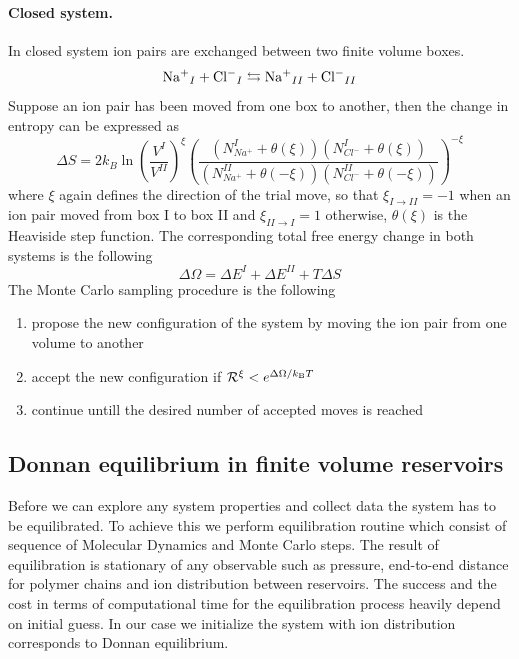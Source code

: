 \documentclass[journal=mamobx, layout=twocolumns,manuscript=article]{achemso}
\begin{document}
\paragraph{Closed system.}
In closed system ion pairs are exchanged between two finite volume boxes.
\begin{equation}
    \mathrm{Na^+}_{I} + \mathrm{Cl^-}_{I} \leftrightarrows \mathrm{Na^+}_{II} + \mathrm{Cl^-}_{II}
\end{equation}
Suppose an ion pair has been moved from one box to another, then the change in entropy can be expressed as
\begin{equation}
    \Delta S = 2 k_B \ln \left(\frac{V^{I}}{V^{II}} \right) ^ {\xi}  \left(\frac{(N_{Na^{+}}^{I}+\theta(\xi))(N_{Cl^{-}}^{I}+\theta(\xi))}{(N_{Na^{+}}^{II}+\theta(-\xi))(N_{Cl^{-}}^{II}+\theta(-\xi))}\right)^{-\xi}
\end{equation}
where $\xi$ again defines the direction of the trial move, so that $\xi_{I \rightarrow II} = -1$ when an ion pair moved from box I to box II and  $\xi_{II \rightarrow I} = 1$ otherwise, $\theta(\xi)$ is the Heaviside step function.
The corresponding total free energy change in both systems is the following 
\begin{equation}
\Delta\Omega = \Delta E^{I}+\Delta E^{II}+T\Delta S
\end{equation}
The Monte Carlo sampling procedure is the following
\begin{enumerate}
	\item propose the new configuration of the system by moving the ion pair from one volume to another 
	\item accept the new configuration if $\mathcal{R}^{\xi}<e^{\Delta\Omega/k_\mathrm{B}T}$
	\item continue untill the desired number of accepted moves is reached
\end{enumerate}

\subsection{Donnan equilibrium in finite volume reservoirs}
Before we can explore any system properties and collect data the system has to be equilibrated. To achieve this we perform equilibration routine which consist of sequence of Molecular Dynamics and Monte Carlo steps.
The result of equilibration is stationary of any observable such as pressure, end-to-end distance for polymer chains and ion distribution between reservoirs. 
The success and the cost in terms of computational time for the equilibration process heavily depend on initial guess. 
In our case we initialize the system with ion distribution corresponds to Donnan equilibrium.
\end{document}
